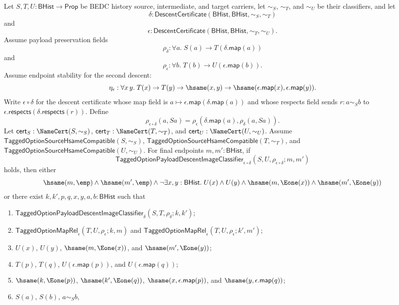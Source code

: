 \begin{theorem}
Let $S,T,U:\mathsf{BHist}\to\mathsf{Prop}$ be BEDC history source,
intermediate, and target carriers, let $\sim_S$, $\sim_T$, and $\sim_U$ be their
classifiers, and let
$$
\delta:\mathsf{DescentCertificate}(\mathsf{BHist},\mathsf{BHist},\sim_S,\sim_T)
$$
and
$$
\epsilon:\mathsf{DescentCertificate}(\mathsf{BHist},\mathsf{BHist},\sim_T,\sim_U).
$$
Assume payload preservation fields
$$
\rho_{\delta}:\forall a.\;S(a)\to T(\delta.\mathsf{map}(a))
$$
and
$$
\rho_{\epsilon}:\forall b.\;T(b)\to U(\epsilon.\mathsf{map}(b)).
$$
Assume endpoint stability for the second descent:
$$
\eta_{\epsilon}:\forall x\,y.\;
T(x)\to T(y)\to \hsame(x,y)\to
\hsame(\epsilon.\mathsf{map}(x),\epsilon.\mathsf{map}(y)).
$$
Write $\epsilon\circ\delta$ for the descent certificate whose map field is
$a\mapsto\epsilon.\mathsf{map}(\delta.\mathsf{map}(a))$ and whose respects field
sends $r:a\sim_S b$ to
$\epsilon.\mathsf{respects}(\delta.\mathsf{respects}(r))$. Define
$$
\rho_{\epsilon\circ\delta}(a,Sa)=
\rho_{\epsilon}(\delta.\mathsf{map}(a),\rho_{\delta}(a,Sa)).
$$
Let $\mathsf{cert}_S:\NameCert(S,\sim_S)$,
$\mathsf{cert}_T:\NameCert(T,\sim_T)$, and
$\mathsf{cert}_U:\NameCert(U,\sim_U)$. Assume
$\mathsf{TaggedOptionSourceHsameCompatible}(S,\sim_S)$,
$\mathsf{TaggedOptionSourceHsameCompatible}(T,\sim_T)$, and
$\mathsf{TaggedOptionSourceHsameCompatible}(U,\sim_U)$. For final endpoints
$m,m':\mathsf{BHist}$, if
$$
\mathsf{TaggedOptionPayloadDescentImageClassifier}_{\epsilon\circ\delta}
(S,U,\rho_{\epsilon\circ\delta};m,m')
$$
holds, then either
$$
\hsame(m,\emp)\land \hsame(m',\emp)\land
\neg\exists x,y:\mathsf{BHist}.\;
U(x)\land U(y)\land
\hsame(m,\Eone(x))\land
\hsame(m',\Eone(y))
$$
or there exist $k,k',p,q,x,y,a,b:\mathsf{BHist}$ such that
\begin{enumerate}
\item $\mathsf{TaggedOptionPayloadDescentImageClassifier}_{\delta}
(S,T,\rho_{\delta};k,k')$;
\item $\mathsf{TaggedOptionMapRel}_{\epsilon}(T,U,\rho_{\epsilon};k,m)$ and
$\mathsf{TaggedOptionMapRel}_{\epsilon}(T,U,\rho_{\epsilon};k',m')$;
\item $U(x)$, $U(y)$, $\hsame(m,\Eone(x))$, and
$\hsame(m',\Eone(y))$;
\item $T(p)$, $T(q)$, $U(\epsilon.\mathsf{map}(p))$, and
$U(\epsilon.\mathsf{map}(q))$;
\item $\hsame(k,\Eone(p))$, $\hsame(k',\Eone(q))$,
$\hsame(x,\epsilon.\mathsf{map}(p))$, and
$\hsame(y,\epsilon.\mathsf{map}(q))$;
\item $S(a)$, $S(b)$, $a\sim_S b$,

\end{enumerate}
\end{theorem}
